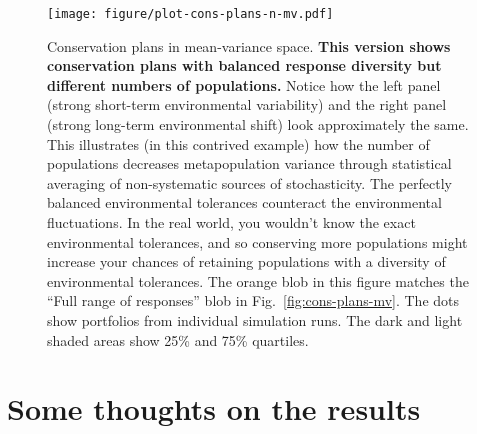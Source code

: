 \documentclass[12pt]{article}
\begin{document}
\begin{figure}[htbp]
\centering
\texttt{[image: figure/plot-cons-plans-n-mv.pdf]}
\caption{Conservation plans in mean-variance space. \textbf{This version
shows conservation plans with balanced response diversity but different
numbers of populations.} Notice how the left panel (strong short-term
environmental variability) and the right panel (strong long-term
environmental shift) look approximately the same. This illustrates (in
this contrived example) how the number of populations decreases
metapopulation variance through statistical averaging of non-systematic
sources of stochasticity. The perfectly balanced environmental
tolerances counteract the environmental fluctuations. In the real world,
you wouldn't know the exact environmental tolerances, and so conserving
more populations might increase your chances of retaining populations
with a diversity of environmental tolerances. The orange blob in this
figure matches the ``Full range of responses'' blob in
Fig.~\ref{fig:cons-plans-mv}. The dots show portfolios from individual
simulation runs. The dark and light shaded areas show 25\% and 75\%
quartiles.}
\end{figure}

\clearpage

\section{Some thoughts on the results}
\end{document}
